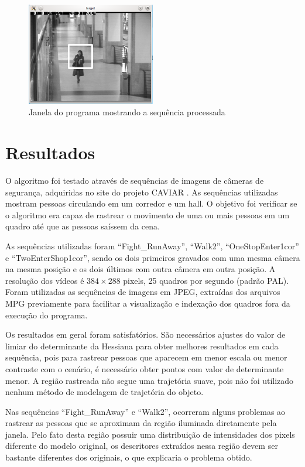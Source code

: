 \documentclass[a4paper]{coursepaper-br}
\begin{document}
\begin{figure}
\centering
\includegraphics[width=0.5\textwidth]{target.png}
\caption{Janela do programa mostrando a sequência processada}
\label{fig:target}
\end{figure}


\section{Resultados}
\label{sec:res}

O algoritmo foi testado através de sequências de imagens de câmeras de
segurança, adquiridas no site do projeto CAVIAR \cite{Fisher2007}. As
sequências utilizadas mostram pessoas circulando em um corredor e um
hall. O objetivo foi verificar se o algoritmo era capaz de rastrear o
movimento de uma ou mais pessoas em um quadro até que as pessoas
saíssem da cena.

As sequências utilizadas foram ``Fight\_RunAway'', ``Walk2'',
``OneStopEnter1cor'' e ``TwoEnterShop1cor'', sendo os dois primeiros
gravados com uma mesma câmera na mesma posição e os dois últimos com
outra câmera em outra posição. A resolução dos vídeos é $384 \times
288$ pixels, 25 quadros por segundo (padrão PAL). Foram utilizadas as
sequências de imagens em JPEG, extraídas dos arquivos MPG previamente
para facilitar a visualização e indexação dos quadros fora da execução
do programa.

Os resultados em geral foram satisfatórios. São necessários ajustes do
valor de limiar do determinante da Hessiana para obter melhores
resultados em cada sequência, pois para rastrear pessoas que aparecem
em menor escala ou menor contraste com o cenário, é necessário obter
pontos com valor de determinante menor. A região rastreada não segue
uma trajetória suave, pois não foi utilizado nenhum método de
modelagem de trajetória do objeto.

Nas sequências ``Fight\_RunAway'' e ``Walk2'', ocorreram alguns
problemas ao rastrear as pessoas que se aproximam da região iluminada
diretamente pela janela. Pelo fato desta região possuir uma
distribuição de intensidades dos pixels diferente do modelo original,
os descritores extraídos nessa região devem ser bastante diferentes
dos originais, o que explicaria o problema obtido.
\end{document}
